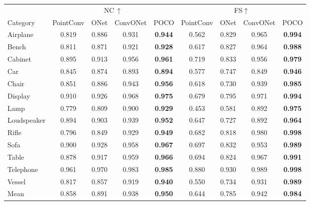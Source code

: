 \documentclass[10pt,twocolumn,letterpaper]{article}
\newcommand\OURS{{POCO}}
\begin{document}
\begin{table*}[h!]
    \begin{tabular}{l|cccc|cccc}
                    & \multicolumn{4}{c|}{NC\,$\uparrow$} & \multicolumn{4}{c}{FS$\uparrow$}\\[1mm] 
        Category    & PointConv & ONet & \!ConvONet\! & \OURS & PointConv & ONet & \!ConvONet\! & \OURS \\
        \midrule
        Airplane    & 0.819 & 0.886 & 0.931 & \bf 0.944	& 0.562 & 0.829 & 0.965 & \bf 0.994\\
        Bench       & 0.811 & 0.871 & 0.921 & \bf 0.928	& 0.617 & 0.827 & 0.964 & \bf 0.988 \\
        Cabinet     & 0.895 & 0.913 & 0.956 & \bf 0.961 & 0.719 & 0.833 & 0.956 & \bf 0.979 \\
        Car         & 0.845 & 0.874 & 0.893 & \bf 0.894 & 0.577 & 0.747 & 0.849 & \bf 0.946 \\
        Chair       & 0.851 & 0.886 & 0.943 & \bf 0.956 & 0.618 & 0.730 & 0.939 & \bf 0.985 \\
        Display     & 0.910 & 0.926 & 0.968 & \bf 0.975 & 0.679 & 0.795 & 0.971 & \bf 0.994 \\
        Lamp        & 0.779 & 0.809 & 0.900 & \bf 0.929 & 0.453 & 0.581 & 0.892 & \bf 0.975 \\
        Loudspeaker & 0.894 & 0.903 & 0.939 & \bf 0.952 & 0.647 & 0.727 & 0.892 & \bf 0.964 \\
        Rifle       & 0.796 & 0.849 & 0.929 & \bf 0.949 & 0.682 & 0.818 & 0.980 & \bf 0.998 \\
        Sofa        & 0.900 & 0.928 & 0.958 & \bf 0.967 & 0.697 & 0.832 & 0.953 & \bf 0.989 \\
        Table       & 0.878 & 0.917 & 0.959 & \bf 0.966 & 0.694 & 0.824 & 0.967 & \bf 0.991 \\
        Telephone   & 0.961 & 0.970 & 0.983 & \bf 0.985 & 0.880 & 0.930 & 0.989 & \bf 0.998 \\
        Vessel      & 0.817 & 0.857 & 0.919 & \bf 0.940 & 0.550 & 0.734 & 0.931 & \bf 0.989 \\
        \midrule
        Mean        & 0.858 & 0.891 & 0.938 & \bf 0.950 & 0.644 & 0.785 & 0.942 & \bf 0.984
    \end{tabular}
    
    \caption{\textbf{Classwise ShapeNet reconstruction.} All models are trained on 3k noisy points. Results for methods other than {\OURS} are reported from the supplementary material of ConvONet~\cite{Peng2020ECCV}.}
    \label{tab:shapenet_per_class}
\end{table*}
\end{document}
